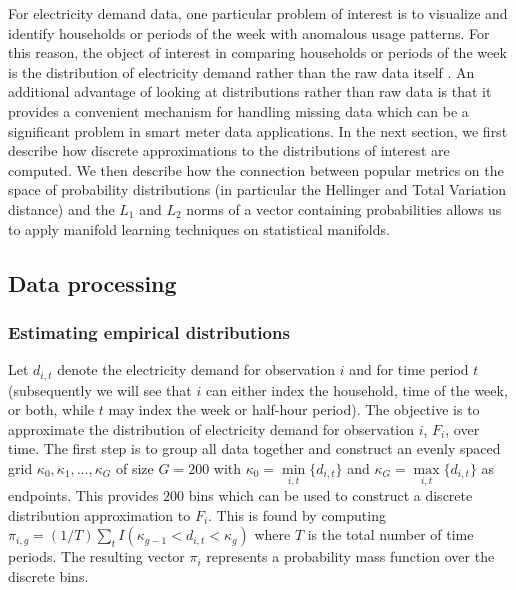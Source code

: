 \documentclass[11pt,a4paper,]{article}
\begin{document}
For electricity demand data, one particular problem of interest is to visualize and identify households or periods of the week with anomalous usage patterns. For this reason, the object of interest in comparing households or periods of the week is the distribution of electricity demand rather than the raw data itself \autocite{Hyndman2018-ia}. An additional advantage of looking at distributions rather than raw data is that it provides a convenient mechanism for handling missing data which can be a significant problem in smart meter data applications. In the next section, we first describe how discrete approximations to the distributions of interest are computed. We then describe how the connection between popular metrics on the space of probability distributions (in particular the Hellinger and Total Variation distance) and the \(L_1\) and \(L_2\) norms of a vector containing probabilities allows us to apply manifold learning techniques on statistical manifolds.

\hypertarget{dataprocessing}{%
\subsection{Data processing}\label{dataprocessing}}

\hypertarget{estimating-empirical-distributions}{%
\subsubsection*{Estimating empirical distributions}\label{estimating-empirical-distributions}}

Let \(d_{i,t}\) denote the electricity demand for observation \(i\) and for time period \(t\) (subsequently we will see that \(i\) can either index the household, time of the week, or both, while \(t\) may index the week or half-hour period). The objective is to approximate the distribution of electricity demand for observation \(i\), \(F_i\), over time. The first step is to group all data together and construct an evenly spaced grid \(\kappa_0,\kappa_1,\dots,\kappa_G\) of size \(G=200\) with \(\kappa_0=\underset{i,t}{\min} \{d_{i,t}\}\) and \(\kappa_G=\underset{i,t}{\max} \{d_{i,t}\}\) as endpoints. This provides \(200\) bins which can be used to construct a discrete distribution approximation to \(F_i\). This is found by computing \(\pi_{i,g}=(1/T)\sum_t I(\kappa_{g-1}<d_{i,t}<\kappa_g)\) where \(T\) is the total number of time periods. The resulting vector \(\pi_i\) represents a probability mass function over the discrete bins.
\end{document}
